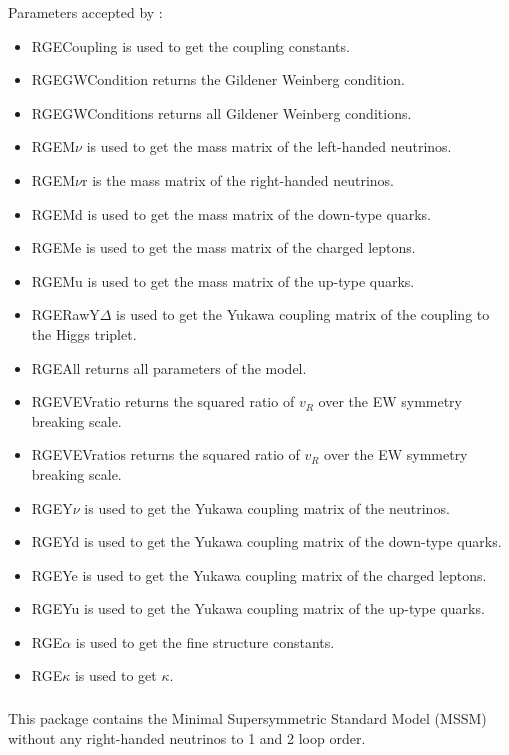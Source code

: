 \documentclass[10pt,a4paper,twoside]{scrartcl}
\begin{document}
Parameters accepted by :
\begin{itemize}
\item 
RGECoupling is used to get the coupling constants.
\item 
RGEGWCondition returns the Gildener Weinberg condition.
\item 
RGEGWConditions returns all Gildener Weinberg conditions.
\item 
RGEM$\nu$ is used to get the mass matrix of the left-handed neutrinos.
\item 
RGEM$\nu$r is the mass matrix of the right-handed neutrinos.
\item 
RGEMd is used to get the mass matrix of the down-type quarks.
\item 
RGEMe is used to get the mass matrix of the charged leptons.
\item 
RGEMu is used to get the mass matrix of the up-type quarks.
\item 
RGERawY$\Delta$ is used to get the Yukawa coupling matrix of the coupling to the Higgs triplet.
\item 
RGEAll returns all parameters of the model.
\item 
RGEVEVratio returns the squared ratio of $v_R$ over the EW symmetry breaking scale.
\item 
RGEVEVratios returns the squared ratio of $v_R$ over the EW symmetry breaking scale.
\item 
RGEY$\nu$ is used to get the Yukawa coupling matrix of the neutrinos.
\item 
RGEYd is used to get the Yukawa coupling matrix of the down-type quarks.
\item 
 RGEYe is used to get the Yukawa coupling matrix of the charged leptons.
\item 
RGEYu is used to get the Yukawa coupling matrix of the up-type quarks.
\item 
RGE$\alpha$ is used to get the fine structure constants.
\item 
RGE$\kappa$ is used to get $\kappa$.

\end{itemize}

\subsubsection[\package{RGEMSSM0N}]{}
This package contains the Minimal Supersymmetric Standard Model (MSSM) without
any right-handed neutrinos to 1 and 2 loop order.
\end{document}
